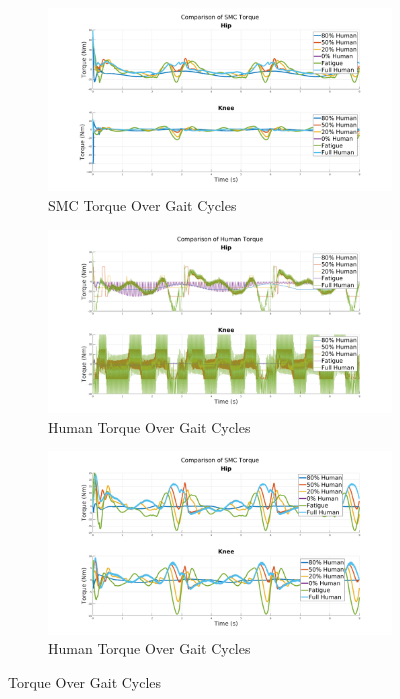 \begin{figure}
    \centering
    \begin{subfigure}{0.8\linewidth}
        \centering
        \includegraphics[width=\columnwidth]{images/controllers/gait/SMC.png}
        \caption[SMC Torque Over Gait Cycles]{SMC Torque Over Gait Cycles}
        \label{fig:SMCTripleGaitMotion}
    \end{subfigure}
    \begin{subfigure}{0.8\linewidth}
        \centering
        \includegraphics[width=\columnwidth]{images/controllers/gait/human.png}
        \caption[Human Torque Over Gait Cycles]{Human Torque Over Gait Cycles}
        \label{fig:HumanTripleGaitMotion}
    \end{subfigure}
        \begin{subfigure}{0.8\linewidth}
        \centering
        \includegraphics[width=\columnwidth]{images/controllers/gait/feedback.png}
        \caption[Human Torque Over Gait Cycles]{Human Torque Over Gait Cycles}
        \label{fig:InteractionTripleGaitInteration}
    \end{subfigure}
    \caption{Torque Over Gait Cycles}
    \label{fig:TorqueOverGaitCycles}
\end{figure}
